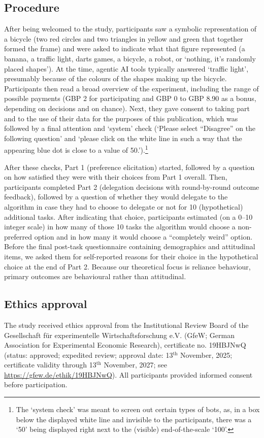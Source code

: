 \documentclass[a4paper, 12pt, fleqn]{article}
\theoremstyle{hypstyle}
\begin{document}
\subsection{Procedure}
After being welcomed to the study, participants saw a symbolic representation of a bicycle (two red circles and two triangles in yellow and green that together formed the frame) and were asked to indicate what that figure represented (a banana, a traffic light, darts games, a bicycle, a robot, or `nothing, it's randomly placed shapes'). At the time, agentic AI tools typically answered `traffic light', presumably because of the colours of the shapes making up the bicycle. Participants then read a broad overview of the experiment, including the range of possible payments (GBP 2 for participating and GBP 0 to GBP 8.90 as a bonus, depending on decisions and on chance). Next, they gave consent to taking part and to the use of their data for the purposes of this publication, which was followed by a final 
attention and `system' check (`Please select ``Disagree'' on the following question' and `please click on the white line in such a way that the appearing blue dot is close to a value of 50.').\footnote{The `system check' was meant to screen out certain types of bots, as, in a box below the displayed white line and invisible to the participants, there was a `50' being displayed right next to the (visible) end-of-the-scale `100'.}

After these checks, Part 1 (preference elicitation) started, followed by a question on how satisfied they were with their choices from Part 1 overall. Then, participants completed Part 2 (delegation decisions with round-by-round outcome feedback), followed by a question of whether they would delegate to the algorithm in case they had to choose to delegate or not for 10 (hypothetical) additional tasks. After indicating that choice, participants estimated (on a 0--10 integer scale) in how many of those 10 tasks the algorithm would choose a non-preferred option and in how many it would choose a ``completely weird'' option. Before the final post-task questionnaire containing demographics and attitudinal items, we asked them for self-reported reasons for their choice in the hypothetical choice at the end of Part 2. Because our theoretical focus is reliance behaviour, primary outcomes are behavioural rather than attitudinal.

\subsection{Ethics approval}
The study received ethics approval from the Institutional Review Board of the Gesellschaft für experimentelle Wirtschaftsforschung e.V. (GfeW; German Association for Experimental Economic Research), certificate no. 19HBJNwQ (status: approved; expedited review; approval date: 13$^\text{th}$ November, 2025; certificate validity through 13$^\text{th}$ November, 2027; see {\footnotesize\url{https://gfew.de/ethik/19HBJNwQ}}). All participants provided informed consent before participation.
\end{document}
